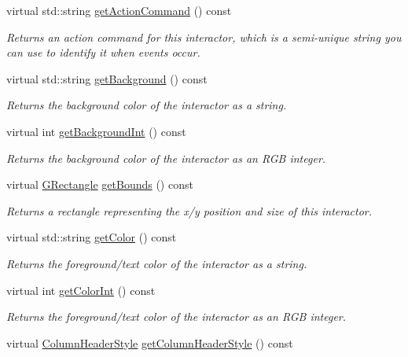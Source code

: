 \begin{DoxyCompactItemize}
virtual std\+::string \mbox{\hyperlink{classGInteractor_a94eb4276000c4fdfb508ce9e6317a82a}{get\+Action\+Command}} () const
\begin{DoxyCompactList}\small\item\em Returns an action command for this interactor, which is a semi-\/unique string you can use to identify it when events occur. \end{DoxyCompactList}\item 
virtual std\+::string \mbox{\hyperlink{classGInteractor_a808e22cc1fdfbecf71ed8c64ef4600e0}{get\+Background}} () const
\begin{DoxyCompactList}\small\item\em Returns the background color of the interactor as a string. \end{DoxyCompactList}\item 
virtual int \mbox{\hyperlink{classGInteractor_a9e827257a55cb8cf4d9de2ec6bcfd7a0}{get\+Background\+Int}} () const
\begin{DoxyCompactList}\small\item\em Returns the background color of the interactor as an R\+GB integer. \end{DoxyCompactList}\item 
virtual \mbox{\hyperlink{structGRectangle}{G\+Rectangle}} \mbox{\hyperlink{classGInteractor_a29e6ac35a0b48f491a4c88194cc5da3b}{get\+Bounds}} () const
\begin{DoxyCompactList}\small\item\em Returns a rectangle representing the x/y position and size of this interactor. \end{DoxyCompactList}\item 
virtual std\+::string \mbox{\hyperlink{classGInteractor_aa061dfa488c31e18549d64363c1d0e34}{get\+Color}} () const
\begin{DoxyCompactList}\small\item\em Returns the foreground/text color of the interactor as a string. \end{DoxyCompactList}\item 
virtual int \mbox{\hyperlink{classGInteractor_a9635c7af766cdc3417f346683fa0e6c1}{get\+Color\+Int}} () const
\begin{DoxyCompactList}\small\item\em Returns the foreground/text color of the interactor as an R\+GB integer. \end{DoxyCompactList}\item 
virtual \mbox{\hyperlink{classGTable_a060cff504451bbb98530e64e936e2671}{Column\+Header\+Style}} \mbox{\hyperlink{classGTable_a31ffc9e14dda3e91d1a1b3be81a42db8}{get\+Column\+Header\+Style}} () const

\end{DoxyCompactItemize}
